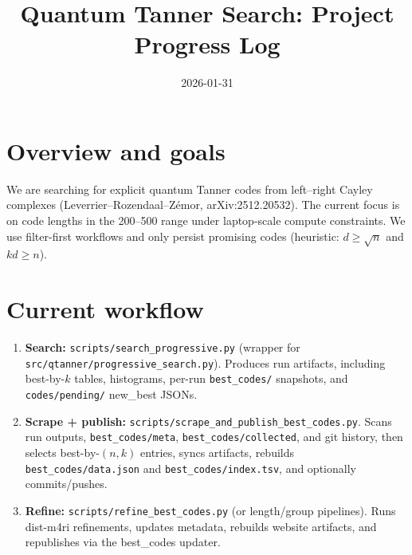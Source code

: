 \documentclass[11pt]{article}
\title{Quantum Tanner Search: Project Progress Log}
\author{}
\date{2026-01-31}
\begin{document}
\maketitle

\section{Overview and goals}
We are searching for explicit quantum Tanner codes from left--right Cayley complexes
(Leverrier--Rozendaal--Z\'emor, arXiv:2512.20532). The current focus is on code
lengths in the 200--500 range under laptop-scale compute constraints. We use
filter-first workflows and only persist promising codes (heuristic: $d \ge \sqrt{n}$
and $k d \ge n$).

\section{Current workflow}
\begin{enumerate}
  \item \textbf{Search:} \texttt{scripts/search\_progressive.py} (wrapper for
    \texttt{src/qtanner/progressive\_search.py}). Produces run artifacts, including
    best-by-$k$ tables, histograms, per-run \texttt{best\_codes/} snapshots, and
    \texttt{codes/pending/} new\_best JSONs.
  \item \textbf{Scrape + publish:} \texttt{scripts/scrape\_and\_publish\_best\_codes.py}.
    Scans run outputs, \texttt{best\_codes/meta}, \texttt{best\_codes/collected}, and
    git history, then selects best-by-$(n,k)$ entries, syncs artifacts, rebuilds
    \texttt{best\_codes/data.json} and \texttt{best\_codes/index.tsv}, and optionally
    commits/pushes.
  \item \textbf{Refine:} \texttt{scripts/refine\_best\_codes.py} (or length/group
    pipelines). Runs dist-m4ri refinements, updates metadata, rebuilds website
    artifacts, and republishes via the best\_codes updater.
\end{enumerate}
\end{document}
